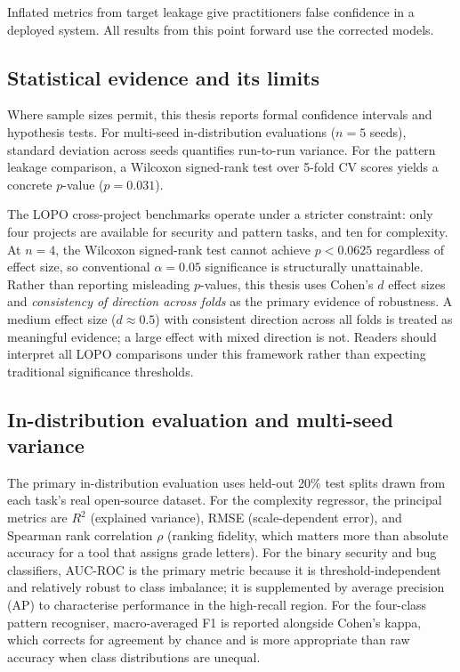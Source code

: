 \documentclass[12pt, oneside]{report}
\begin{document}
Inflated metrics from target leakage give practitioners false confidence in a deployed
system. All results from this point forward use the corrected models.

\subsection{Statistical evidence and its limits}
\label{ssec:stat-limits}

Where sample sizes permit, this thesis reports formal confidence intervals and
hypothesis tests. For multi-seed in-distribution evaluations ($n = 5$ seeds), standard
deviation across seeds quantifies run-to-run variance. For the pattern leakage comparison,
a Wilcoxon signed-rank test over 5-fold CV scores yields a concrete $p$-value ($p = 0.031$).

The LOPO cross-project benchmarks operate under a stricter constraint: only four projects
are available for security and pattern tasks, and ten for complexity. At $n = 4$,
the Wilcoxon signed-rank test cannot achieve $p < 0.0625$ regardless of effect size,
so conventional $\alpha = 0.05$ significance is structurally unattainable. Rather than
reporting misleading $p$-values, this thesis uses Cohen's $d$ effect sizes and
\textit{consistency of direction across folds} as the primary evidence of robustness.
A medium effect size ($d \approx 0.5$) with consistent direction across all folds is
treated as meaningful evidence; a large effect with mixed direction is not. Readers
should interpret all LOPO comparisons under this framework rather than expecting
traditional significance thresholds.

\subsection{In-distribution evaluation and multi-seed variance}

The primary in-distribution evaluation uses held-out 20\% test splits drawn from each
task's real open-source dataset. For the complexity regressor, the principal metrics are
$R^2$ (explained variance), RMSE (scale-dependent error), and Spearman rank correlation
$\rho$ (ranking fidelity, which matters more than absolute accuracy for a tool that
assigns grade letters). For the binary security and bug classifiers, AUC-ROC is the
primary metric because it is threshold-independent and relatively robust to class
imbalance; it is supplemented by average precision (AP) to characterise performance
in the high-recall region. For the four-class pattern recogniser, macro-averaged F1 is
reported alongside Cohen's kappa, which corrects for agreement by chance and is more
appropriate than raw accuracy when class distributions are unequal.
\end{document}
